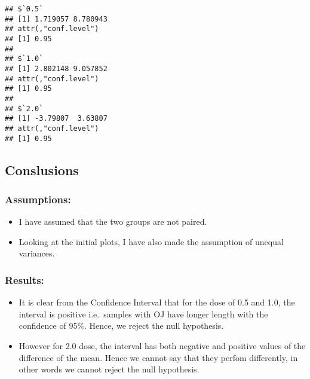 \documentclass[
]{article}
\providecommand{\tightlist}{%
  \setlength{\itemsep}{0pt}\setlength{\parskip}{0pt}}
\begin{document}
\begin{verbatim}
## $`0.5`
## [1] 1.719057 8.780943
## attr(,"conf.level")
## [1] 0.95
## 
## $`1.0`
## [1] 2.802148 9.057852
## attr(,"conf.level")
## [1] 0.95
## 
## $`2.0`
## [1] -3.79807  3.63807
## attr(,"conf.level")
## [1] 0.95
\end{verbatim}

\hypertarget{conslusions}{%
\subsection{Conslusions}\label{conslusions}}

\hypertarget{assumptions}{%
\subsubsection{Assumptions:}\label{assumptions}}

\begin{itemize}
\tightlist
\item
  I have assumed that the two groups are not paired.\\
\item
  Looking at the initial plots, I have also made the assumption of
  unequal variances.
\end{itemize}

\hypertarget{results}{%
\subsubsection{Results:}\label{results}}

\begin{itemize}
\tightlist
\item
  It is clear from the Confidence Interval that for the dose of 0.5 and
  1.0, the interval is positive i.e.~samples with OJ have longer length
  with the confidence of 95\%. Hence, we reject the null hypothesis.\\
\item
  However for 2.0 dose, the interval has both negative and positive
  values of the difference of the mean. Hence we cannot say that they
  perfom differently, in other words we cannot reject the null
  hypothesis.
\end{itemize}
\end{document}
